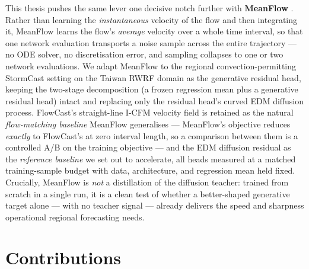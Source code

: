 This thesis pushes the same lever one decisive notch further with \textbf{MeanFlow} \citep{geng2025meanflow}. Rather than learning the \emph{instantaneous} velocity of the flow and then integrating it, MeanFlow learns the flow's \emph{average} velocity over a whole time interval, so that one network evaluation transports a noise sample across the entire trajectory --- no ODE solver, no discretisation error, and sampling collapses to one or two network evaluations. We adapt MeanFlow to the regional convection-permitting StormCast setting on the Taiwan RWRF domain as the generative residual head, keeping the two-stage decomposition (a frozen regression mean plus a generative residual head) intact and replacing only the residual head's curved EDM diffusion process. FlowCast's straight-line I-CFM velocity field is retained as the natural \emph{flow-matching baseline} MeanFlow generalises --- MeanFlow's objective reduces \emph{exactly} to FlowCast's at zero interval length, so a comparison between them is a controlled A/B on the training objective --- and the EDM diffusion residual as the \emph{reference baseline} we set out to accelerate, all heads measured at a matched training-sample budget with data, architecture, and regression mean held fixed. Crucially, MeanFlow is \emph{not} a distillation of the diffusion teacher: trained from scratch in a single run, it is a clean test of whether a better-shaped generative target alone --- with no teacher signal --- already delivers the speed and sharpness operational regional forecasting needs.

\section{Contributions}
\label{sec:intro-contributions}

